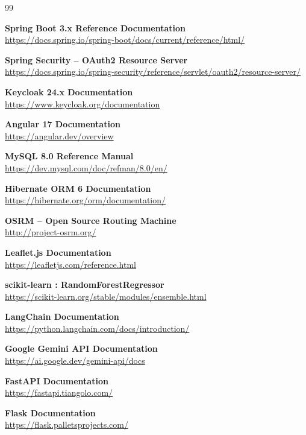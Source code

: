 \documentclass[12pt,a4paper]{report}
\begin{document}
\begin{thebibliography}{99}

\textbf{Spring Boot 3.x Reference Documentation}\\
\url{https://docs.spring.io/spring-boot/docs/current/reference/html/}

\textbf{Spring Security -- OAuth2 Resource Server}\\
\url{https://docs.spring.io/spring-security/reference/servlet/oauth2/resource-server/}

\textbf{Keycloak 24.x Documentation}\\
\url{https://www.keycloak.org/documentation}

\textbf{Angular 17 Documentation}\\
\url{https://angular.dev/overview}

\textbf{MySQL 8.0 Reference Manual}\\
\url{https://dev.mysql.com/doc/refman/8.0/en/}

\textbf{Hibernate ORM 6 Documentation}\\
\url{https://hibernate.org/orm/documentation/}

\textbf{OSRM -- Open Source Routing Machine}\\
\url{http://project-osrm.org/}

\textbf{Leaflet.js Documentation}\\
\url{https://leafletjs.com/reference.html}

\textbf{scikit-learn : RandomForestRegressor}\\
\url{https://scikit-learn.org/stable/modules/ensemble.html}

\textbf{LangChain Documentation}\\
\url{https://python.langchain.com/docs/introduction/}

\textbf{Google Gemini API Documentation}\\
\url{https://ai.google.dev/gemini-api/docs}

\textbf{FastAPI Documentation}\\
\url{https://fastapi.tiangolo.com/}

\textbf{Flask Documentation}\\
\url{https://flask.palletsprojects.com/}


\end{thebibliography}
\end{document}
